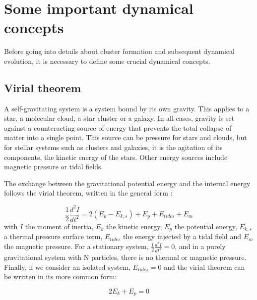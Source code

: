 %


\section{Some important dynamical concepts}

Before going into details about cluster formation and subsequent dynamical evolution, it is necessary to define some crucial dynamical concepts.

\subsection{Virial theorem}

A self-gravitating system is a system bound by its own gravity. This applies to a star, a molecular cloud, a star cluster or a galaxy. In all cases, gravity is set against a counteracting source of energy that prevents the total collapse of matter into a single point. This source can be pressure for stars and clouds, but for stellar systems such as clusters and galaxies, it is the agitation of its components, the kinetic energy of the stars. Other energy sources include magnetic pressure or tidal fields.

The exchange between the gravitational potential energy and the internal energy follows the virial theorem, written in the general form \citep{McKee2007,BT}:

\begin{equation}
\frac{1}{2} \frac{d^2 I}{dt^2} = 2 ( E_k - E_{k,s}) +  E_p + E_{tides} + E_m
\end{equation}
with $I$ the moment of inertia, $E_k$ the kinetic energy, $E_p$ the potential energy, $E_{k,s}$  a thermal pressure surface term, $E_{tides}$ the energy injected by a tidal field and $E_m$ the magnetic pressure. For a stationary system, $\frac{1}{2} \frac{d^2 I}{dt^2} = 0$, and in a purely gravitational system with N particles, there is no thermal or magnetic pressure. Finally, if we consider an isolated system, $E_{tides}=0$ and the virial theorem can be written in its more common form:

\begin{equation}
2 E_k + E_p = 0
\end{equation}

